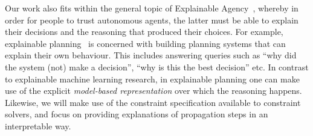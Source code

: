 Our work also fits within the general topic of Explainable Agency~\cite{langley2017explainable}, whereby in order for people to trust autonomous agents, the latter must be able to explain their decisions and the reasoning that produced their choices. 
For example, explainable planning~\cite{fox2017explainable} is concerned with building planning systems that can explain their own behaviour. This includes answering queries such as ``why did the system (not) make a decision'', ``why is this the best decision'' etc. In contrast to explainable machine learning research, in explainable planning one can make use of the explicit \textit{model-based representation} over which the reasoning happens. Likewise, we will make use of the constraint specification available to constraint solvers, and focus on providing explanations of propagation steps in an interpretable way.


